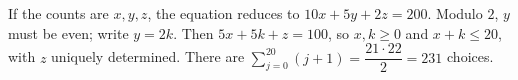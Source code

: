 If the counts are $x,y,z$, the equation reduces to $10x+5y+2z=200$. Modulo $2$, $y$ must be even; write $y=2k$. Then $5x+5k+z=100$, so $x,k\ge0$ and $x+k\le20$, with $z$ uniquely determined. There are $\sum_{j=0}^{20}(j+1)=\dfrac{21\cdot22}{2}=\boxed{231}$ choices.
